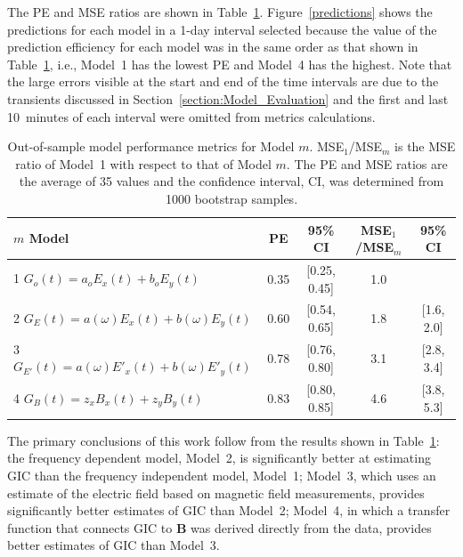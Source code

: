\documentclass[draft,linenumbers]{agujournal2018}
\begin{document}
The PE and MSE ratios are shown in Table~\ref{results}. Figure~\ref{predictions} shows the predictions for each model in a 1-day interval selected because the value of the prediction efficiency for each model was in the same order as that shown in Table~\ref{results}, i.e., Model~1 has the lowest PE and Model~4 has the highest. Note that the large errors visible at the start and end of the time intervals are due to the transients discussed in Section~\ref{section:Model_Evaluation} and the first and last 10~minutes of each interval were omitted from metrics calculations.

\begin{table}
  \caption{Out-of-sample model performance metrics for Model $m$. MSE$_1$/MSE$_m$ is the MSE ratio of Model~1 with respect to that of Model $m$. The PE and MSE ratios are the average of 35 values and the confidence interval, CI, was determined from 1000 bootstrap samples.}
  \centering
  \begin{tabular}{l c c c c}
    \hline
    $m$\hspace{1em} Model & PE & 95\% CI & MSE$_1$/MSE$_m$ & 95\% CI\\
    \hline
    1\hspace{1em} $G_o(t) = a_oE_x(t) + b_oE_y(t)$ & 0.35 & [0.25, 0.45] & 1.0 & \\
    2\hspace{1em} $G_E(t) = a(\omega)E_x(t) + b(\omega)E_y(t)$ & 0.60 & [0.54, 0.65] & 1.8 & [1.6, 2.0]\\
    3\hspace{1em} $G_{E'}(t) = a(\omega)E'_x(t) + b(\omega)E'_y(t)$ & 0.78 & [0.76, 0.80] & 3.1 & [2.8, 3.4]\\
    4\hspace{1em} $G_{B}(t) = z_xB_x(t) + z_yB_y(t)$ & 0.83 & [0.80, 0.85] & 4.6 & [3.8, 5.3]\\
    \hline
  \end{tabular}
  \label{results}
\end{table}

The primary conclusions of this work follow from the results shown in Table~\ref{results}: the frequency dependent model, Model~2, is significantly better at estimating GIC than the frequency independent model, Model~1; Model~3, which uses an estimate of the electric field based on magnetic field measurements, provides significantly better estimates of GIC than Model~2; Model~4, in which a transfer function that connects GIC to $\mathbf{B}$ was derived directly from the data, provides better estimates of GIC than Model~3.
\end{document}
